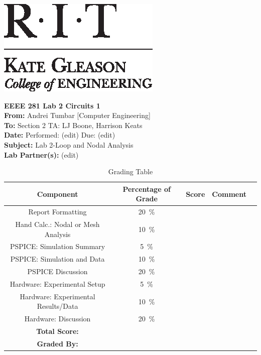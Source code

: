 \documentclass[11pt]{article}
\begin{document}
	\hspace{6in}
		\includegraphics[scale=0.9,trim=0cm 0in 0in 0.0in,clip]{RIT_KGCOE1}
\newline

\Huge \textbf{EEEE 281 Lab 2 Circuits 1}\\

\Large
\textbf{From:} Andrei Tumbar [Computer Engineering] \\
\textbf{To: } Section 2 TA: LJ Boone, Harrison Keats \\
\textbf{Date: } Performed: (edit)  Due: (edit) \\
\textbf{Subject: } Lab 2-Loop and Nodal Analysis\\
\textbf{Lab Partner(s): } (edit)\\
\vspace{0.5in}
	\begin{table}[h!]
		\centering
		\caption{Grading Table}
		\label{Table:Grading Table 1}
		\begin{tabular}{|c||c|c|c|c|}
			\hline
			Component & Percentage of Grade   & Score \hspace{0.5in} & Comment \hspace{1in}  \\
			\hline
			Report Formatting & 20~\si{\percent} & & \\	 
			\hline
			Hand Calc.: Nodal or Mesh Analysis& 10~\si{\percent} & & \\	 
			\hline
			PSPICE: Simulation Summary & 5~\si{\percent} & & \\	 
			\hline 
			PSPICE: Simulation and Data & 10~\si{\percent} & & \\	 
			\hline
			PSPICE Discussion & 20~\si{\percent} & & \\	 
			\hline
			Hardware: Experimental Setup & 5~\si{\percent} & & \\	 
			 \hline
			Hardware: Experimental Results/Data & 10~\si{\percent} & & \\	 
			 \hline
			 Hardware: Discussion & 20~\si{\percent} & & \\	 
			 \hline
			 
			\textbf{Total Score:}&  & & \\	 
			\hline
			\textbf{Graded By:}&  & & \\	 
			\hline
			
		\end{tabular}
	\end{table}
\end{document}
